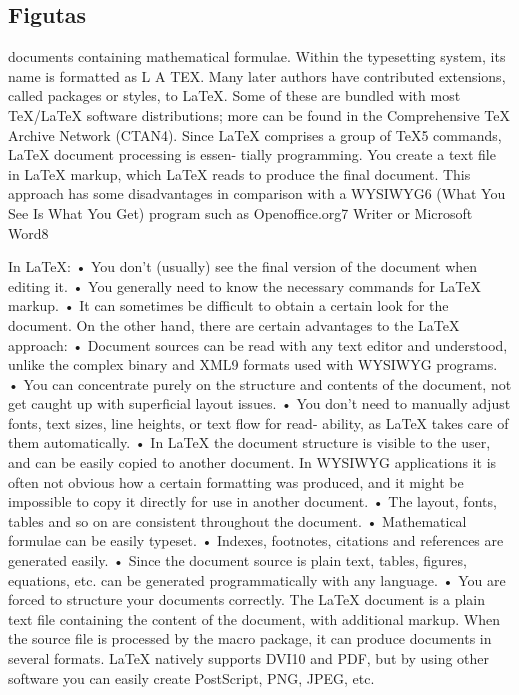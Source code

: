 \documentclass[a4paper,12pt]{article}
\begin{document}
\subsection{Figutas}
documents containing mathematical formulae. Within the typesetting system, its name
is formatted as L A TEX.
Many later authors have contributed extensions, called packages or styles, to LaTeX. Some
of these are bundled with most TeX/LaTeX software distributions; more can be found in
the Comprehensive TeX Archive Network (CTAN4).
Since LaTeX comprises a group of TeX5 commands, LaTeX document processing is essen-
tially programming. You create a text file in LaTeX markup, which LaTeX reads to produce
the final document.
This approach has some disadvantages in comparison with a WYSIWYG6 (What You See
Is What You Get) program such as Openoﬃce.org7 Writer or Microsoft Word8

In LaTeX:
• You don't (usually) see the final version of the document when editing it.
• You generally need to know the necessary commands for LaTeX markup.
• It can sometimes be diﬃcult to obtain a certain look for the document.
On the other hand, there are certain advantages to the LaTeX approach:
• Document sources can be read with any text editor and understood, unlike the complex
binary and XML9 formats used with WYSIWYG programs.
• You can concentrate purely on the structure and contents of the document, not get caught
up with superficial layout issues.
• You don't need to manually adjust fonts, text sizes, line heights, or text flow for read-
ability, as LaTeX takes care of them automatically.
• In LaTeX the document structure is visible to the user, and can be easily copied to another
document. In WYSIWYG applications it is often not obvious how a certain formatting
was produced, and it might be impossible to copy it directly for use in another document.
• The layout, fonts, tables and so on are consistent throughout the document.
• Mathematical formulae can be easily typeset.
• Indexes, footnotes, citations and references are generated easily.
• Since the document source is plain text, tables, figures, equations, etc. can be generated
programmatically with any language.
• You are forced to structure your documents correctly.
The LaTeX document is a plain text file containing the content of the document, with
additional markup. When the source file is processed by the macro package, it can produce
documents in several formats. LaTeX natively supports DVI10 and PDF, but by using other
software you can easily create PostScript, PNG, JPEG, etc.
\end{document}
